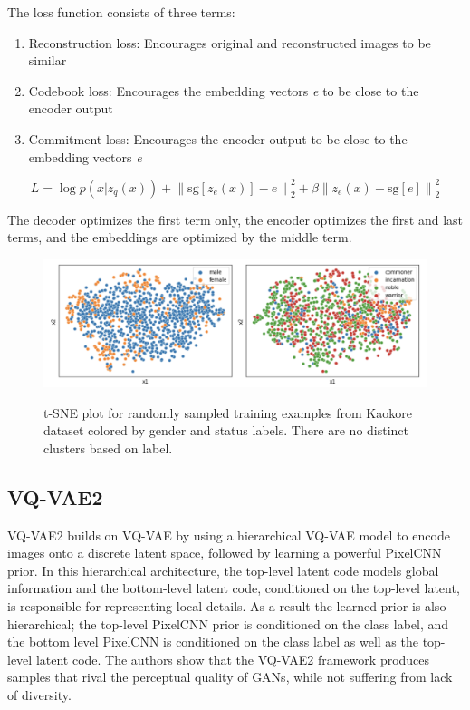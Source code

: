 \documentclass{article}
\begin{document}
The loss function consists of three terms: 
\begin{enumerate}
\item Reconstruction loss: Encourages original and reconstructed images to be similar
\item Codebook loss: Encourages the embedding vectors \textit{e} to be close to the encoder output 
\item Commitment loss: Encourages the encoder output to be close to the embedding vectors \textit{e} 
\end{enumerate}

\begin{equation}
L = \log{p(x|z_q(x))} + {\|\textrm{sg}[z_e(x)]-e\|}_{2}^{2} + \beta{\|z_e(x)-\textrm{sg}[e]\|}_{2}^{2}
\end{equation}

The decoder optimizes the first term only, the encoder optimizes the first and last terms, and the embeddings are optimized by the middle term. 

\begin{figure}[!h]
    \centering
    \includegraphics[width=0.8\linewidth]{clustering.png}
    \label{fig:clustering}
    \caption{t-SNE plot for randomly sampled training examples from Kaokore dataset colored by gender and status labels. There are no distinct clusters based on label.}
\end{figure}

\subsection{VQ-VAE2}

VQ-VAE2 builds on VQ-VAE by using a hierarchical VQ-VAE model to encode images onto a discrete latent space, followed by learning a powerful PixelCNN prior. In this hierarchical architecture, the top-level latent code models global information and the bottom-level latent code, conditioned on the top-level latent, is responsible for representing local details. As a result the learned prior is also hierarchical; the top-level PixelCNN prior is conditioned on the class label, and the bottom level PixelCNN is conditioned on the class label as well as the top-level latent code. The authors show that the VQ-VAE2 framework produces samples that rival the perceptual quality of GANs, while not suffering from lack of diversity. 
\end{document}
